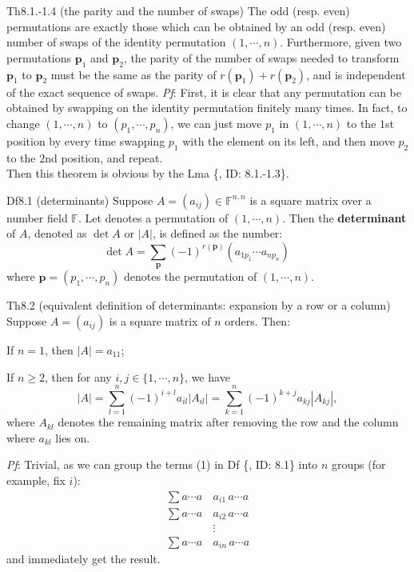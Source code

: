 \documentclass{article}
\begin{document}
\begin{Th}{Th8.1.-1.4 (the parity and the number of swaps)}
    The odd (resp. even) permutations are exactly those which can be obtained by an odd (resp. even) number of swaps of the identity permutation $(1,\cdots,n)$. Furthermore, given two permutations $\pmb{p}_1$ and $\pmb{p}_2$, the parity of the number of swaps needed to transform $\pmb{p}_1$ to $\pmb{p}_2$ must be the same as the parity of $r(\pmb{p}_1)+r(\pmb{p}_2)$, and is independent of the exact sequence of swaps.
    \tcblower
    \textit{Pf}: First, it is clear that any permutation can be obtained by swapping on the identity permutation finitely many times. In fact, to change $(1, \cdots, n)$ to $(p_1, \cdots, p_n)$, we can just move $p_1$ in $(1,\cdots, n)$ to the $1$st position by every time swapping $p_1$ with the element on its left, and then move $p_2$ to the $2$nd position, and repeat. \\
    Then this theorem is obvious by the Lma \{, ID: 8.1.-1.3\}.
\end{Th}

\begin{Df}{Df8.1 (determinants)}
    Suppose $A = (a_{ij})\in \mathbb{F}^{n,n}$ is a square matrix over a number field $\mathbb{F}$. Let denotes a permutation of $(1,\cdots,n)$. Then the \textbf{determinant} of $A$, denoted as $\det A$ or $|A|$, is defined as the number:
    \begin{equation}
        \det A = \sum_{\pmb{p}} (-1)^{r(\pmb{p})} (a_{1p_1}\cdots a_{np_n})\qquad \tag{1}
    \end{equation}
    where $\pmb{p} = (p_1, \cdots, p_n)$ denotes the permutation of $(1,\cdots,n)$.
\end{Df}

\begin{Th}{Th8.2 (equivalent definition of determinants: expansion by a row or a column)}
    Suppose $A = (a_{ij})$ is a square matrix of $n$ orders. Then:
    \begin{compactenum}
        \item If $n=1$, then $|A| = a_{11}$;
        \item If $n\geq 2$, then for any $i,j\in \{1,\cdots,n\}$, we have
        $$ |A| = \sum_{l=1}^{n} (-1)^{i+l} a_{il}|A_{il}| = \sum_{k=1}^{n} (-1)^{k+j} a_{kj}|A_{kj}|, $$
        where $A_{kl}$ denotes the remaining matrix after removing the row and the column where $a_{kl}$ lies on.
    \end{compactenum}
    \tcblower
    \textit{Pf}: Trivial, as we can group the terms (1) in Df \{, ID: 8.1\} into $n$ groups (for example, fix $i$):
    $$
    \begin{aligned}
        \sum a\cdots a\, & a_{i1}\, a\cdots a \\
        \sum a\cdots a\, & a_{i2}\, a\cdots a \\
        &\vdots \\
        \sum a\cdots a\, & a_{in}\, a\cdots a
    \end{aligned}
    $$
    and immediately get the result.
\end{Th}
\end{document}
